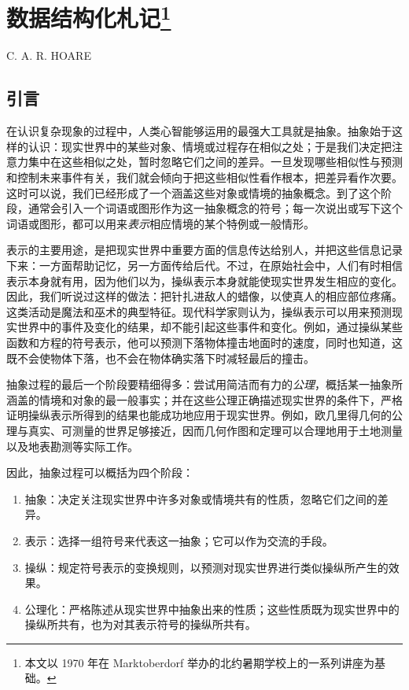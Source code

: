 \chapter[数据结构化札记]{数据结构化札记\footnote{本文以 1970 年在 Marktoberdorf 举办的北约暑期学校上的一系列讲座为基础。}}

{
	\noindent
	\scshape\hfill\scriptsize C. A. R. HOARE\hfill
}
\renewcommand{\leftmark}{\normalfont\scriptsize\hfill C. A. R. HOARE\hfill}
\medskip

\section{引言}

在认识复杂现象的过程中，人类心智能够运用的最强大工具就是抽象。抽象始于这样的认识：现实世界中的某些对象、情境或过程存在相似之处；于是我们决定把注意力集中在这些相似之处，暂时忽略它们之间的差异。一旦发现哪些相似性与预测和控制未来事件有关，我们就会倾向于把这些相似性看作根本，把差异看作次要。这时可以说，我们已经形成了一个涵盖这些对象或情境的抽象概念。到了这个阶段，通常会引入一个词语或图形作为这一抽象概念的符号；每一次说出或写下这个词语或图形，都可以用来\textit{表示}相应情境的某个特例或一般情形。

表示的主要用途，是把现实世界中重要方面的信息传达给别人，并把这些信息记录下来：一方面帮助记忆，另一方面传给后代。不过，在原始社会中，人们有时相信表示本身就有用，因为他们以为，操纵表示本身就能使现实世界发生相应的变化。因此，我们听说过这样的做法：把针扎进敌人的蜡像，以使真人的相应部位疼痛。这类活动是魔法和巫术的典型特征。现代科学家则认为，操纵表示可以用来预测现实世界中的事件及变化的结果，却不能引起这些事件和变化。例如，通过操纵某些函数和方程的符号表示，他可以预测下落物体撞击地面时的速度，同时也知道，这既不会使物体下落，也不会在物体确实落下时减轻最后的撞击。

抽象过程的最后一个阶段要精细得多：尝试用简洁而有力的\textit{公理}，概括某一抽象所涵盖的情境和对象的最一般事实；并在这些公理正确描述现实世界的条件下，严格证明操纵表示所得到的结果也能成功地应用于现实世界。例如，欧几里得几何的公理与真实、可测量的世界足够接近，因而几何作图和定理可以合理地用于土地测量以及地表勘测等实际工作。

因此，抽象过程可以概括为四个阶段：

\begin{enumerate}[wide, nosep, label=(\arabic*)]
	\item 抽象：决定关注现实世界中许多对象或情境共有的性质，忽略它们之间的差异。
	\item 表示：选择一组符号来代表这一抽象；它可以作为交流的手段。
	\item 操纵：规定符号表示的变换规则，以预测对现实世界进行类似操纵所产生的效果。
	\item 公理化：严格陈述从现实世界中抽象出来的性质；这些性质既为现实世界中的操纵所共有，也为对其表示符号的操纵所共有。
\end{enumerate}

